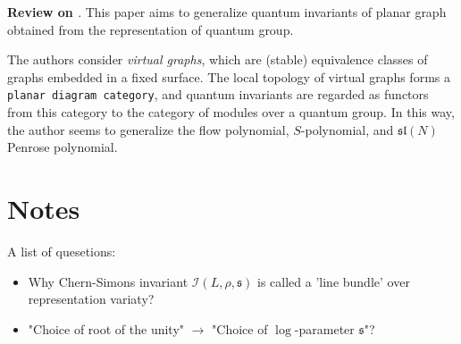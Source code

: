 \documentclass[11pt]{amsart}
\begin{document}
\medskip
\noindent \textbf{Review on \cite{McPhailSnyder_Miller-2020-planar_diagrams}}.
This paper aims to generalize quantum invariants of planar graph obtained from the representation of quantum group.

The authors consider \textit{virtual graphs}, which are (stable) equivalence classes of graphs embedded in a fixed surface.
The local topology of virtual graphs forms a \texttt{planar diagram category}, and quantum invariants are regarded as functors from this category to the category of modules over a quantum group.
In this way, the author seems to generalize the flow polynomial, $S$-polynomial, and $\mathfrak{sl}(N)$ Penrose polynomial.

\medskip
\noindent

\section{Notes}

\begin{center}
    \cite{McPhailSnyder-2025-quantization_tangle}
\end{center}

A list of quesetions:
\begin{itemize}
    \item Why Chern-Simons invariant $\mathcal{I}(L, \rho, \mathfrak{s})$ is called a 'line bundle' over representation variaty?
    \item "Choice of root of the unity" $\rightarrow$ "Choice of $\log$-parameter $\mathfrak{s}$"?
\end{itemize}
\end{document}
